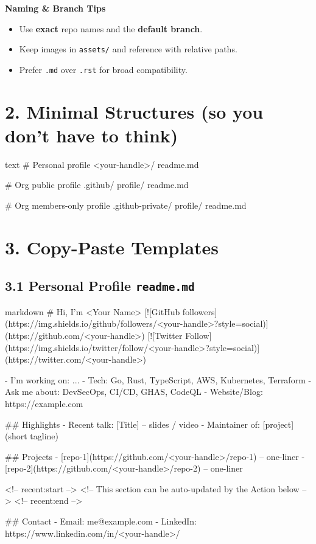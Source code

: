 \documentclass[11pt]{article}
\renewcommand{\kbd}[1]{\texttt{#1}}
\begin{document}
\begin{tcolorbox}
\textbf{Naming \& Branch Tips}
\begin{itemize}
  \item Use \textbf{exact} repo names and the \textbf{default branch}.
  \item Keep images in \kbd{assets/} and reference with relative paths.
  \item Prefer \texttt{.md} over \texttt{.rst} for broad compatibility.
\end{itemize}
\end{tcolorbox}
\clearpage

\section*{2. Minimal Structures (so you don't have to think)}
\begin{code}{text}
# Personal profile
<your-handle>/
  readme.md

# Org public profile
.github/
  profile/
    readme.md

# Org members-only profile
.github-private/
  profile/
    readme.md
\end{code}

\section*{3. Copy-Paste Templates}

\subsection*{3.1 Personal Profile \texttt{readme.md}}
\begin{code}{markdown}
# Hi, I'm <Your Name>
[![GitHub followers](https://img.shields.io/github/followers/<your-handle>?style=social)](https://github.com/<your-handle>)
[![Twitter Follow](https://img.shields.io/twitter/follow/<your-handle>?style=social)](https://twitter.com/<your-handle>)

- I'm working on: ...
- Tech: Go, Rust, TypeScript, AWS, Kubernetes, Terraform
- Ask me about: DevSecOps, CI/CD, GHAS, CodeQL
- Website/Blog: https://example.com

## Highlights
- Recent talk: [Title] -- slides / video
- Maintainer of: [project] (short tagline)

## Projects
- [repo-1](https://github.com/<your-handle>/repo-1) -- one-liner
- [repo-2](https://github.com/<your-handle>/repo-2) -- one-liner

<!-- recent:start -->
<!-- This section can be auto-updated by the Action below -->
<!-- recent:end -->

## Contact
- Email: me@example.com - LinkedIn: https://www.linkedin.com/in/<your-handle>/
\end{code}
\end{document}
